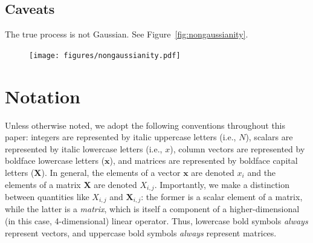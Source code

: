 \documentclass[modern]{aastex62}
\begin{document}
\subsection{Caveats}
\label{sec:caveats}
The true process is not Gaussian. See Figure~\ref{fig:nongaussianity}.
\begin{figure}[ht!]
    \begin{centering}
        \texttt{[image: figures/nongaussianity.pdf]}
    \end{centering}
\end{figure}

%
%
%
%

\appendix

%
%
%
%

\section{Notation}
\label{sec:notation}
%
Unless otherwise noted, we adopt
the following conventions throughout this paper:
integers are represented by italic uppercase letters (i.e., $N$),
scalars are represented by italic lowercase
letters (i.e., $x$), column vectors are
represented by boldface lowercase letters
($\mathbf{x}$), and matrices are represented
by boldface capital letters ($\mathbf{X}$). In general, the elements of a vector
$\mathbf{x}$ are denoted $x_i$ and the elements of a matrix $\mathbf{X}$
are denoted $X_{i,j}$. Importantly, we make a distinction between
quantities like $X_{i,j}$ and $\mathbf{X}_{i,j}$: the former is a scalar
element of a matrix, while the latter is a \emph{matrix}, which is itself
a component of a higher-dimensional (in this case, 4-dimensional) linear
operator. Thus, lowercase bold symbols \emph{always} represent vectors, and
uppercase bold symbols \emph{always} represent matrices.
\end{document}
